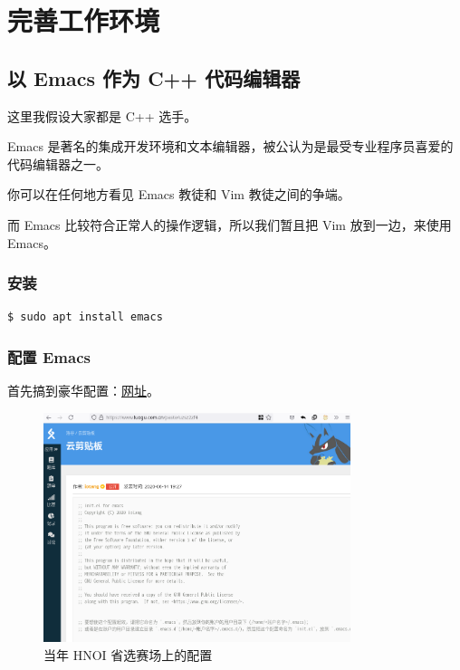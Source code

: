 \documentclass[UTF-8]{ctexart}
\begin{document}
	\section{完善工作环境}
	
		\subsection{以 Emacs 作为 C++ 代码编辑器}
		
			这里我假设大家都是 C++ 选手。
			
			Emacs 是著名的集成开发环境和文本编辑器，被公认为是最受专业程序员喜爱的代码编辑器之一。
			
			你可以在任何地方看见 Emacs 教徒和 Vim 教徒之间的争端。
			
			而 Emacs 比较符合正常人的操作逻辑，所以我们暂且把 Vim 放到一边，来使用 Emacs。
		
			\subsubsection{安装}
		
				\begin{verbatim}
$ sudo apt install emacs
				\end{verbatim}
			
			\subsubsection{配置 Emacs}
			
				首先搞到豪华配置：\href{https://www.luogu.com.cn/paste/uzsz2zf4}{网址}。
				
				\begin{figure}[H]
					\centering
					\includegraphics[width=0.8\textwidth]{fig/emacs_init_el.png}
					\caption*{当年 HNOI 省选赛场上的配置}
				\end{figure}
			
\end{document}
